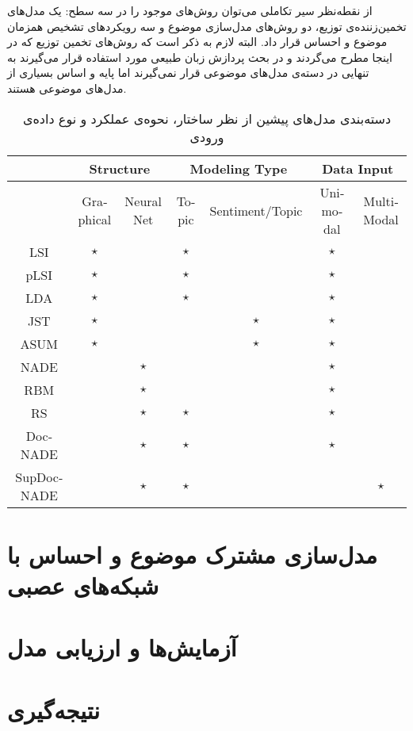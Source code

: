 \documentclass[12pt,a4paper]{article}
\begin{document}
از نقطه‌نظر سیر تکاملی می‌‌توان روش‌های موجود را در سه‌ سطح: یک مدل‌های تخمین‌زننده‌ی توزیع، دو روش‌های مدل‌سازی موضوع و سه رویکردهای تشخیص همزمان موضوع و احساس قرار داد. البته لازم به ذکر است که روش‌های تخمین توزیع که در اینجا مطرح می‌‌گردند و در بحث پردازش زبان طبیعی مورد استفاده قرار می‌‌گیرند به تنهایی در دسته‌ی مدل‌های موضوعی قرار نمی‌‌گیرند اما پایه و اساس بسیاری از مدل‌های موضوعی هستند.
\begin{footnotesize}
\begin{table}[!t]
\centering
\begin{latin}
\begin{tabular}{|||c|||c|c|||c|c|||c|c|||}
	\hline\hline
	           &  \multicolumn{2}{|c|||}{Structure}   & \multicolumn{2}{|c|||}{Modeling Type} & \multicolumn{2}{|c|||}{Data Input}\\
	           \hline\hline
	           & Graphical & Neural Net & Topic & Sentiment/Topic & Unimodal & MultiModal \\ \hline
	   LSI     & $\star$         &                  & $\star$     &                       & $\star$  &  \\ \hline
	   pLSI    & $\star$         &                  & $\star$     &                       & $\star$  &  \\ \hline
	   LDA     & $\star$         &                  & $\star$     &                       & $\star$  &  \\ \hline
	   JST     & $\star$         &                  &             & $\star$               & $\star$  &  \\ \hline
	   ASUM    & $\star$         &                  &             & $\star$               & $\star$  &  \\ \hline
	   NADE    &                 & $\star$          &             &                       & $\star$  &  \\ \hline
	   RBM     &                 & $\star$          &             &                       & $\star$  &  \\ \hline
	    RS     &                 & $\star$          & $\star$     &                       & $\star$  &  \\ \hline
	 DocNADE   &                 & $\star$          & $\star$     &                       & $\star$  &  \\ \hline
	SupDocNADE &                 & $\star$          & $\star$     &                       &          & $\star$     \\ \hline\hline
\end{tabular}
\end{latin}
\caption{دسته‌بندی مدل‌های پیشین از نظر ساختار، نحوه‌ی عملکرد و نوع داده‌ی ورودی}
\label{tabel3-1}
\end{table}
\end{footnotesize}

\section{مدل‌سازی مشترک موضوع و احساس با شبکه‌های عصبی}	
\section{آزمایش‌ها و ارزیابی مدل}
\section{نتیجه‌گیری}

\newpage


\end{document}
